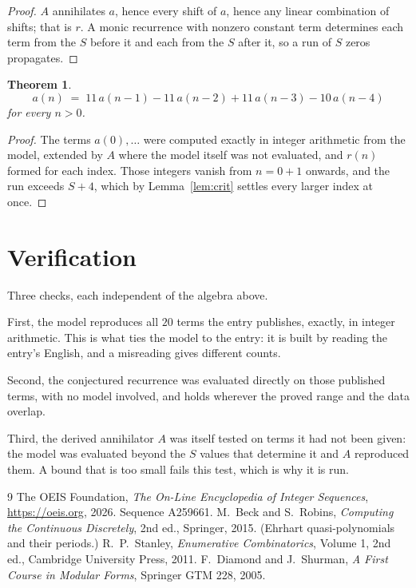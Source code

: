\documentclass[11pt,a4paper]{article}
\theoremstyle{plain}
\newtheorem{theorem}{Theorem}
\theoremstyle{definition}
\begin{document}
\begin{proof}
$A$ annihilates $a$, hence every shift of $a$, hence any linear combination of shifts; that is
$r$. A monic recurrence with nonzero constant term determines each term from the $S$ before it
and each from the $S$ after it, so a run of $S$ zeros propagates.
\end{proof}

\begin{theorem}
\[
a(n)\;=\;11\,a(n-1) - 11\,a(n-2) + 11\,a(n-3) - 10\,a(n-4)
\]
for every $n>0$.
\end{theorem}

\begin{proof}
The terms $a(0),\dots$ were computed exactly in integer arithmetic from the model, extended by
$A$ where the model itself was not evaluated, and $r(n)$ formed for each index. Those integers
vanish from $n=0+1$ onwards, and the run exceeds $S+4$, which by
Lemma~\ref{lem:crit} settles every larger index at once.
\end{proof}

\section{Verification}

Three checks, each independent of the algebra above.

First, the model reproduces all $20$ terms the entry publishes, exactly, in integer
arithmetic. This is what ties the model to the entry: it is built by reading the entry's
English, and a misreading gives different counts.

Second, the conjectured recurrence was evaluated directly on those published terms, with no
model involved, and holds wherever the proved range and the data overlap.

Third, the derived annihilator $A$ was itself tested on terms it had not been given: the model
was evaluated beyond the $S$ values that determine it and $A$ reproduced them. A bound that is
too small fails this test, which is why it is run.

\begin{thebibliography}{9}
 The OEIS Foundation, \emph{The On-Line Encyclopedia of Integer
Sequences}, \url{https://oeis.org}, 2026. Sequence A259661.
 M.~Beck and S.~Robins, \emph{Computing the Continuous Discretely},
2nd ed., Springer, 2015. (Ehrhart quasi-polynomials and their periods.)
 R.~P.~Stanley, \emph{Enumerative Combinatorics}, Volume 1, 2nd ed.,
Cambridge University Press, 2011.
 F.~Diamond and J.~Shurman, \emph{A First Course in Modular Forms},
Springer GTM 228, 2005.
\end{thebibliography}
\end{document}

